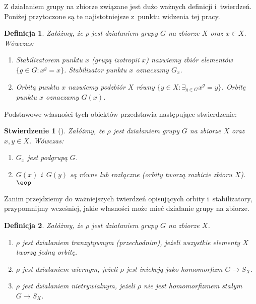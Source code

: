 \documentclass[licencjacka]{pracamgr}
\newtheorem{deff}{Definicja}[section]
\newtheorem{fact}{Stwierdzenie}[section]
\begin{document}
Z działaniem grupy na zbiorze związane jest dużo ważnych definicji
i~twierdzeń. Poniżej przytoczone są te najistotniejsze z~punktu
widzenia tej pracy.

\begin{deff}
    Załóżmy, że $\rho$ jest działaniem grupy $G$ na zbiorze $X$ oraz $x \in X$. Wówczas:
    \begin{enumerate}[label=\alph*)]
     \item \emph{Stabilizatorem punktu $x$ (grupą izotropii $x$)} nazwiemy zbiór elementów $\{g \in G\colon x^g = x \}$.
                    Stabilizator punktu $x$ oznaczamy $G_x$.
     \item \emph{Orbitą punktu $x$} nazwiemy podzbiór $X$ równy $\{y \in X \colon \exists_{g \in G} x^g = y \}$.
                    Orbitę punktu $x$ oznaczamy $G(x)$.
    \end{enumerate}
\end{deff}

Podstawowe własności tych obiektów przedstawia następujące stwierdzenie:
\begin{fact} [{\cite[tw. 1.3.a,b)]{BB}}]
    Załóżmy, że $\rho$ jest działaniem grupy $G$ na zbiorze $X$ oraz $x, y \in X$. Wówczas:
    \begin{enumerate}[label=\alph*)]
     \item $G_x$ jest podgrupą $G$.
     \item $G(x)$ i~$G(y)$ są równe lub rozłączne (orbity tworzą rozbicie zbioru $X$).\quad$\eop$
    \end{enumerate}
\end{fact}

Zanim przejdziemy do ważniejszych twierdzeń opisujących orbity
i~stabilizatory, przypomnijmy wcześniej, jakie własności może mieć
działanie grupy na zbiorze.

\begin{deff}
    Załóżmy, że $\rho$ jest działaniem grupy $G$ na zbiorze $X$.
    \begin{enumerate}[label=\alph*)]
     \item \emph{$\rho$ jest działaniem tranzytywnym (przechodnim)}, jeżeli wszystkie elementy $X$ tworzą jedną orbitę.
     \item \emph{$\rho$ jest działaniem wiernym}, jeżeli $\rho$ jest iniekcją jako homomorfizm $G \to S_X$.
     \item \emph{$\rho$ jest działaniem nietrywialnym}, jeżeli $\rho$ nie jest homomorfizmem stałym $G \to S_X$.
    \end{enumerate}
\end{deff}
\end{document}

